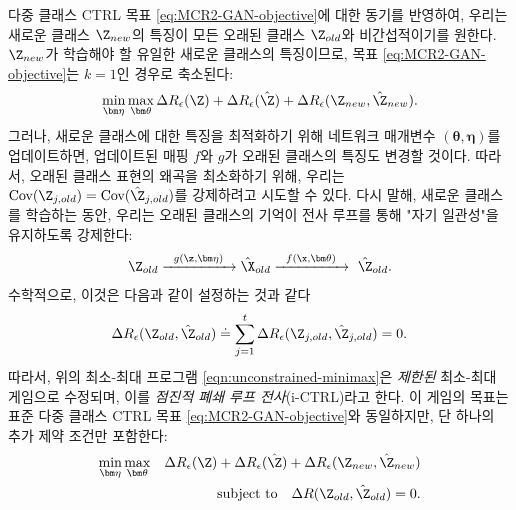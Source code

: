 \documentclass[../../book-main_ko.tex]{subfiles}
\begin{document}
다중 클래스 CTRL 목표 \eqref{eq:MCR2-GAN-objective}에 대한 동기를 반영하여, 우리는 새로운 클래스 $\Z_{new}$의 특징이 모든 오래된 클래스 $\Z_{old}$와 비간섭적이기를 원한다. $\Z_{new}$가 학습해야 할 유일한 새로운 클래스의 특징이므로, 목표 \eqref{eq:MCR2-GAN-objective}는 $k=1$인 경우로 축소된다:
\begin{equation}
\min_{\bm \eta} \max_{\bm \theta} \Delta{R_\epsilon(\Z)} + \Delta{R_\epsilon(\hat{\Z})}+\Delta{R_\epsilon(\Z_{new},\hat{\Z}_{new})}.
\label{eqn:unconstrained-minimax}
\end{equation}
그러나, 새로운 클래스에 대한 특징을 최적화하기 위해 네트워크 매개변수 $(\bm \theta,\bm \eta)$를 업데이트하면, 업데이트된 매핑 $f$와 $g$가 오래된 클래스의 특징도 변경할 것이다. 따라서, 오래된 클래스 표현의 왜곡을 최소화하기 위해, 우리는 $\mbox{Cov}(\Z_{j,old}) = \mbox{Cov}(\hat{\Z}_{j,old})$를 강제하려고 시도할 수 있다. 다시 말해, 새로운 클래스를 학습하는 동안, 우리는 오래된 클래스의 기억이 전사 루프를 통해 "자기 일관성"을 유지하도록 강제한다:
\begin{equation}
\Z_{old} \xrightarrow{\hspace{2mm} g(\z,\bm \eta) \hspace{2mm}} \hat \X_{old} \xrightarrow{\hspace{2mm} f(\x, \bm \theta)\hspace{2mm}} \ \hat \Z_{old}.
\end{equation}
수학적으로, 이것은 다음과 같이 설정하는 것과 같다
$$\Delta R_\epsilon(\Z_{old},\hat{\Z}_{old}) \doteq  \sum_{j=1}^t \Delta R_\epsilon(\Z_{j,old},\hat{\Z}_{j,old}) = 0.$$  
따라서, 위의 최소-최대 프로그램 \eqref{eqn:unconstrained-minimax}은 {\em 제한된} 최소-최대 게임으로 수정되며, 이를 {\em 점진적 폐쇄 루프 전사}(i-CTRL)라고 한다.
이 게임의 목표는 표준 다중 클래스 CTRL 목표 \eqref{eq:MCR2-GAN-objective}와 동일하지만, 단 하나의 추가 제약 조건만 포함한다:
\begin{eqnarray}
      \min_{\bm \eta} \max_{\bm \theta}  &&\Delta{R_\epsilon(\Z)}+\Delta{R_\epsilon(\hat{\Z})}+\Delta{R_\epsilon(\Z_{new},\hat{\Z}_{new})} \nonumber\\
      && \mbox{subject to} \quad  \Delta R(\Z_{old},\hat{\Z}_{old}) = 0.
\label{eqn:constrained-minimax}
\end{eqnarray}
\end{document}
